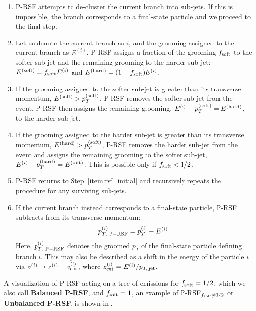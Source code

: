 \begin{enumerate}
    \item
    P-RSF attempts to de-cluster the current branch into sub-jets.
    If this is impossible, the branch corresponds to a final-state particle and we proceed to the final step.
    \label{item:rsf_initial}

    \item
    Let us denote the current branch as \(i\), and the grooming assigned to the current branch as \(E^{(i)}\).
    P-RSF assigns a fraction of the grooming \(f_{\rm soft}\) to the softer sub-jet and the remaining grooming to the harder sub-jet:
    \(E^{\rm(soft)} = f_{\rm soft} E^{(i)}\) and \(E^{\rm(hard)} = (1-f_{\rm soft})E^{(i)}\).
    \label{item:rsf_softhard}

    \item
    If the grooming assigned to the softer sub-jet is greater than its transverse momentum, \(E^{\rm(soft)} > p_T^{(\rm soft)}\), P-RSF removes the softer sub-jet from the event.
    P-RSF then assigns the remaining grooming, \(E^{(i)} - p_T^{(\rm soft)} = E^{\rm(hard)}\), to the harder sub-jet.
    \label{item:remove_soft}

    \item
    If the grooming assigned to the harder sub-jet is greater than its transverse momentum, \(E^{\rm(hard)} > p_T^{(\rm soft)}\), P-RSF removes the harder sub-jet from the event and assigns the remaining grooming to the softer sub-jet, \(E^{(i)} - p_T^{(\rm hard)} = E^{\rm(soft)}\).
    This is possible only if \(f_{\rm soft} < 1/2\).
    \label{item:remove_hard}

    \item
    P-RSF returns to Step~\ref{item:rsf_initial} and recursively repeats the procedure for any surviving sub-jets.

        \item
        If the current branch instead corresponds to a final-state particle, P-RSF subtracts from its transverse momentum:
    \begin{align}
        p^{(i)}_{T,~{\rm P-RSF}} = p^{(i)}_T - E^{(i)}.
    \end{align}
    Here, \(p^{(i)}_{T,~{\rm P-RSF}}\) denotes the groomed \(p_T\) of the final-state particle defining branch \(i\).
    This may also be described as a shift in the energy of the particle \(i\) via \(z^{(i)}\to z^{(i)} - z^{(i)}_{\rm cut}\), where \(z^{(i)}_{\rm cut} = E^{(i)} / p_{T,\,{\rm jet}}\).
        \label{item:rsf_final}
\end{enumerate}
%
A visualization of P-RSF acting on a tree of emissions for \(f_{\rm soft} = 1/2\), which we also call \textbf{Balanced P-RSF}, and \(f_{\rm soft} = 1\), an example of P-RSF\(_{f_{\rm soft}\neq1/2}\) or \textbf{Unbalanced P-RSF}, is shown in .

